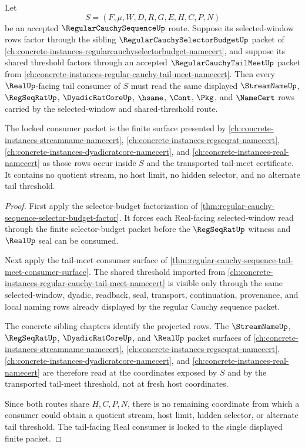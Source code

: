 \begin{theorem}
\label{thm:regular-cauchy-sequence-tail-selector-budget-lock}
Let
$$
S=(F,\mu,W,D,R,G,E,H,C,P,N)
$$
be an accepted $\RegularCauchySequenceUp$ route. Suppose its selected-window rows factor through the sibling $\RegularCauchySelectorBudgetUp$ packet of \autoref{ch:concrete-instances-regularcauchyselectorbudget-namecert}, and suppose its shared threshold factors through an accepted $\RegularCauchyTailMeetUp$ packet from \autoref{ch:concrete-instances-regular-cauchy-tail-meet-namecert}. Then every $\RealUp$-facing tail consumer of $S$ must read the same displayed $\StreamNameUp$, $\RegSeqRatUp$, $\DyadicRatCoreUp$, $\hsame$, $\Cont$, $\Pkg$, and $\NameCert$ rows carried by the selected-window and shared-threshold route.

The locked consumer packet is the finite surface presented by \autoref{ch:concrete-instances-streamname-namecert}, \autoref{ch:concrete-instances-regseqrat-namecert}, \autoref{ch:concrete-instances-dyadicratcore-namecert}, and \autoref{ch:concrete-instances-real-namecert} as those rows occur inside $S$ and the transported tail-meet certificate. It contains no quotient stream, no host limit, no hidden selector, and no alternate tail threshold.
\end{theorem}
\begin{proof}
First apply the selector-budget factorization of \autoref{thm:regular-cauchy-sequence-selector-budget-factor}. It forces each Real-facing selected-window read through the finite selector-budget packet before the $\RegSeqRatUp$ witness and $\RealUp$ seal can be consumed.

Next apply the tail-meet consumer surface of \autoref{thm:regular-cauchy-sequence-tail-meet-consumer-surface}. The shared threshold imported from \autoref{ch:concrete-instances-regular-cauchy-tail-meet-namecert} is visible only through the same selected-window, dyadic, readback, seal, transport, continuation, provenance, and local naming rows already displayed by the regular Cauchy sequence packet.

The concrete sibling chapters identify the projected rows. The $\StreamNameUp$, $\RegSeqRatUp$, $\DyadicRatCoreUp$, and $\RealUp$ packet surfaces of \autoref{ch:concrete-instances-streamname-namecert}, \autoref{ch:concrete-instances-regseqrat-namecert}, \autoref{ch:concrete-instances-dyadicratcore-namecert}, and \autoref{ch:concrete-instances-real-namecert} are therefore read at the coordinates exposed by $S$ and by the transported tail-meet threshold, not at fresh host coordinates.

Since both routes share $H,C,P,N$, there is no remaining coordinate from which a consumer could obtain a quotient stream, host limit, hidden selector, or alternate tail threshold. The tail-facing Real consumer is locked to the single displayed finite packet.
\end{proof}

